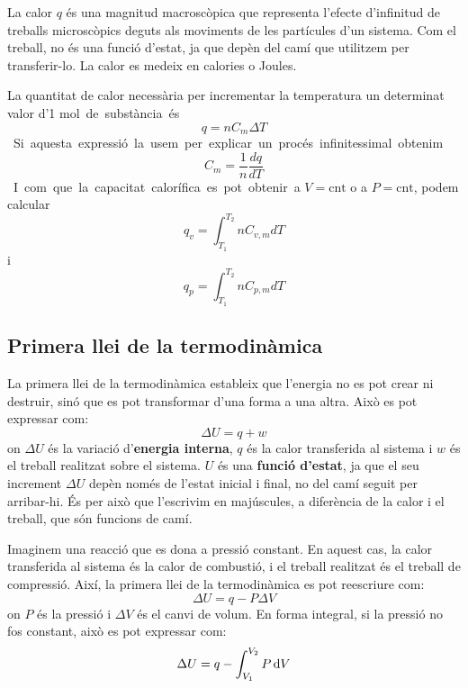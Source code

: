 La calor $q$ és una magnitud macroscòpica que representa l'efecte d'infinitud de treballs microscòpics deguts als moviments de les partícules d'un sistema.
Com el treball, no és una funció d'estat, ja que depèn del camí que utilitzem per transferir-lo.
La calor es medeix en calories o Joules.

La quantitat de calor necessària per incrementar la temperatura un determinat valor d'1 \unit\mole de substància és
\[
q=nC_m\Delta T
\]
Si aquesta expressió la usem per explicar un procés infinitessimal obtenim
\[
C_m=\frac{1}{n}\frac{dq}{dT}
\]
I com que la capacitat calorífica es pot obtenir a $V=\text{cnt}$ o a $P=\text{cnt}$, podem calcular
\[
q_v=\int_{T_1}^{T_2} n C_{v,m} dT
\]
i
\[
q_p=\int_{T_1}^{T_2} n C_{p,m} dT
\]

\subsection{Primera llei de la termodinàmica}

La primera llei de la termodinàmica estableix que l'energia no es pot crear ni destruir, sinó que es pot transformar d'una forma a una altra. Això es pot expressar com:
\begin{equation}
    \Delta U = q + w
\end{equation}
on $\Delta U$ és la variació d'{\bf energia interna}, $q$ és la calor transferida al sistema i $w$ és el treball realitzat sobre el sistema. $U$ és una {\bf funció d'estat}, ja que el seu increment $\Delta U$ depèn només de l'estat inicial i final, no del camí seguit per arribar-hi. És per això que l'escrivim en majúscules, a diferència de la calor i el treball, que són funcions de camí.

Imaginem una reacció que es dona a pressió constant. En aquest cas, la calor transferida al sistema és la calor de combustió, i el treball realitzat és el treball de compressió. Així, la primera llei de la termodinàmica es pot reescriure com:
\begin{equation}
    \Delta U = q - P \Delta V
\end{equation}
on $P$ és la pressió i $\Delta V$ és el canvi de volum.
En forma integral, si la pressió no fos constant, això es pot expressar com:
\begin{equation}
    \Delta U = q - \int_{V_1}^{V_2} P \mathop{}\!\mathrm{d} V
\end{equation}

